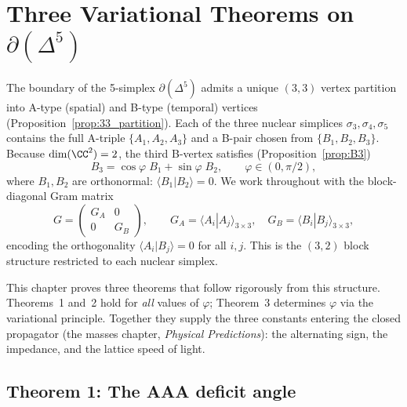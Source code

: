 \section{Three Variational Theorems on $\partial(\Delta^5)$}
\label{ch:variational_theorems}

The boundary of the 5-simplex $\partial(\Delta^5)$ admits a unique
$(3,3)$ vertex partition into A-type (spatial) and B-type (temporal)
vertices (Proposition~\ref{prop:33_partition}).  Each of the three
nuclear simplices $\sigma_3, \sigma_4, \sigma_5$ contains the full
A-triple $\{A_1, A_2, A_3\}$ and a B-pair chosen from
$\{B_1, B_2, B_3\}$.  Because $\dim(\CC^2) = 2$, the third B-vertex
satisfies (Proposition~\ref{prop:B3})
\begin{equation}\label{eq:B3_parametrize}
B_3 = \cos\varphi\; B_1 + \sin\varphi\; B_2,
\qquad \varphi \in (0, \pi/2),
\end{equation}
where $B_1, B_2$ are orthonormal: $\langle B_1 | B_2 \rangle = 0$.
We work throughout with the block-diagonal Gram matrix
\begin{equation}\label{eq:block_gram}
G = \begin{pmatrix} G_A & 0 \\ 0 & G_B \end{pmatrix},
\qquad
G_A = \langle A_i | A_j \rangle_{3\times 3},
\quad
G_B = \langle B_i | B_j \rangle_{3\times 3},
\end{equation}
encoding the orthogonality $\langle A_i | B_j \rangle = 0$ for all
$i, j$.  This is the $(3,2)$ block structure restricted to each
nuclear simplex.

This chapter proves three theorems that follow rigorously from this
structure.  Theorems~1 and~2 hold for \emph{all} values of $\varphi$;
Theorem~3 determines $\varphi$ via the variational principle.
Together they supply the three constants entering the closed propagator
(the masses chapter, \textit{Physical Predictions}): the alternating sign, the impedance, and
the lattice speed of light.

\subsection{Theorem 1: The AAA deficit angle}
\label{sec:thm_AAA}

